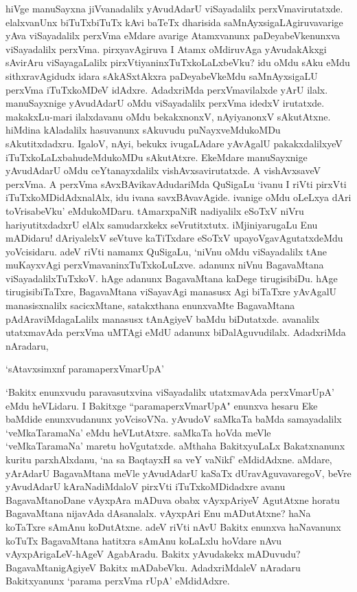 hiVge manuSayxna jiVvanadalilx yAvudAdarU viSayadalilx perxVmavirutatxde. elalxvanUnx biTuTxbiTuTx kAvi baTeTx dharisida saMnAyxsigaLAgiruvavarige yAva viSayadalilx perxVma eMdare 
avarige Atamxvanunx paDeyabeVkenunxva viSayadalilx perxVma. pirxyavAgiruva I Atamx oMdiruvAga yAvudakAkxgi sAvirAru viSayagaLalilx 
pirxVtiyaninxTuTxkoLaLxbeVku? idu oMdu sAku eMdu sithxravAgidudx idara sAkASxtAkxra paDeyabeVkeMdu saMnAyxsigaLU perxVma iTuTxkoMDeV idAdxre. AdadxriMda perxVmavilalxde yArU ilalx. manuSayxnige yAvudAdarU oMdu viSayadalilx perxVma idedxV irutatxde. makakxLu-mari ilalxdavanu oMdu bekakxnonxV, nAyiyanonxV sAkutAtxne. hiMdina kAladalilx hasuvanunx sAkuvudu puNayxveMdukoMDu sAkutitxdadxru. IgaloV, nAyi, bekukx ivugaLAdare yAvAgalU pakakxdalilxyeV iTuTxkoLaLxbahudeMdukoMDu sAkutAtxre. EkeMdare manuSayxnige yAvudAdarU oMdu ceYtanayxdalilx vishAvxsavirutatxde. A vishAvxsaveV perxVma. A perxVma sAvxBAvikavAdudariMda QuSigaLu `ivanu I riVti pirxVti iTuTxkoMDidAdxnalAlx, idu ivana savxBAvavAgide. ivanige oMdu oLeLxya dAri toVrisabeVku' eMdukoMDaru. tAmarxpaNiR nadiyalilx eSoTxV niVru hariyutitxdadxrU elAlx samudarxkekx seVrutitxtutx. iMjiniyarugaLu Enu mADidaru! dAriyalelxV seVtuve kaTiTxdare eSoTxV upayoVgavAgutatxdeMdu yoVcisidaru. adeV riVti namamx QuSigaLu, `niVnu oMdu viSayadalilx tAne muKayxvAgi perxVmavaninxTuTxkoLuLxve. adanunx niVnu BagavaMtana viSayadalilxTuTxkoV. hAge adanunx BagavaMtana kaDege tirugisibiDu. hAge tirugisibiTaTxre, BagavaMtana viSayavAgi manasusx Agi biTaTxre yAvAgalU manasisxnalilx sacicxMtane, satakxthana enunxvaMte BagavaMtana pAdAraviMdagaLalilx manasusx tAnAgiyeV baMdu biDutatxde. avanalilx utatxmavAda perxVma uMTAgi eMdU adanunx biDalAguvudilalx. AdadxriMda nAradaru, 

\begin{shloka}
`sAtavxsimxnf paramaperxVmarUpA'
\end{shloka}

\noindent `Bakitx enunxvudu paravasutxvina viSayadalilx utatxmavAda perxVmarUpA' eMdu heVLidaru. I Bakitxge ``paramaperxVmarUpA" enunxva hesaru Eke baMdide 
enunxvudanunx yoVcisoVNa. yAvudoV saMkaTa baMda samayadalilx `veMkaTaramaNa' eMdu heVLutAtxre. saMkaTa hoVda meVle `veMkaTaramaNa' 
maretu hoVgutatxde. aMthaha BakitxyuLaLx Bakatxnanunx kuritu parxhAlxdanu, `na sa BaqtayxH sa veY vaNikf' eMdidAdxne. aMdare, yArAdarU BagavaMtana meVle yAvudAdarU 
kaSaTx dUravAguvavaregoV, beVre yAvudAdarU kAraNadiMdaloV pirxVti iTuTxkoMDidadxre avanu BagavaMtanoDane vAyxpAra mADuva obabx vAyxpAriyeV 
AgutAtxne horatu BagavaMtana nijavAda dAsanalalx. vAyxpAri Enu mADutAtxne? haNa koTaTxre sAmAnu koDutAtxne. adeV riVti nAvU Bakitx enunxva 
haNavanunx koTuTx BagavaMtana hatitxra sAmAnu koLaLxlu hoVdare nAvu vAyxpArigaLeV-hAgeV AgabAradu. Bakitx yAvudakekx mADuvudu? 
BagavaMtanigAgiyeV Bakitx mADabeVku. AdadxriMdaleV nAradaru Bakitxyanunx `parama perxVma rUpA' eMdidAdxre.

